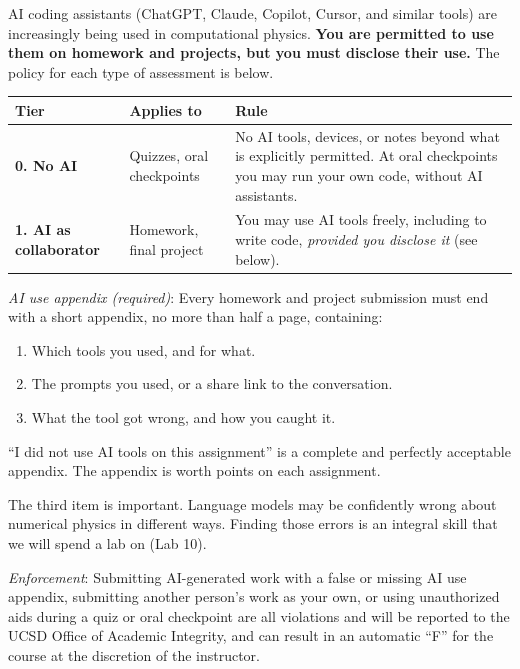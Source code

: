 \documentclass[12pt]{article}
\begin{document}
AI coding assistants (ChatGPT, Claude, Copilot, Cursor, and similar tools) are increasingly being used in computational physics.
\textbf{You are permitted to use them on homework and projects, but you must disclose their use.}
The policy for each type of assessment is below.

\begin{center}
  \begin{tabular}{@{}p{40mm}p{50mm}p{68mm}@{}}
    \toprule
    \textbf{Tier}                  & \textbf{Applies to}       & \textbf{Rule}                                                                                                                             \\
    \midrule
    \textbf{0. No AI}              & Quizzes, oral checkpoints & No AI tools, devices, or notes beyond what is explicitly permitted. At oral checkpoints you may run your own code, without AI assistants. \\
    \addlinespace
    \textbf{1. AI as collaborator} & Homework, final project   & You may use AI tools freely, including to write code, \emph{provided you disclose it} (see below).                                        \\
    \bottomrule
  \end{tabular}
\end{center}

\vspace{2mm}
\noindent\emph{AI use appendix (required)}: Every homework and project submission must end with a short appendix, no more than half a page, containing:
\begin{enumerate}
  \itemsep-0.3em
  \item Which tools you used, and for what.
  \item The prompts you used, or a share link to the conversation.
  \item What the tool got wrong, and how you caught it.
\end{enumerate}
``I did not use AI tools on this assignment'' is a complete and perfectly acceptable appendix.
The appendix is worth points on each assignment.

\vspace{2mm}
\noindent The third item is important.
Language models may be confidently wrong about numerical physics in different ways.
Finding those errors is an integral skill that we will spend a lab on (Lab 10).

\vspace{2mm}
\noindent \emph{Enforcement}: Submitting AI-generated work with a false or missing AI use appendix, submitting another person's work as your own, or using unauthorized aids during a quiz or oral checkpoint are all violations and will be reported to the UCSD Office of Academic Integrity, and can result in an automatic ``F'' for the course at the discretion of the instructor.
\end{document}
